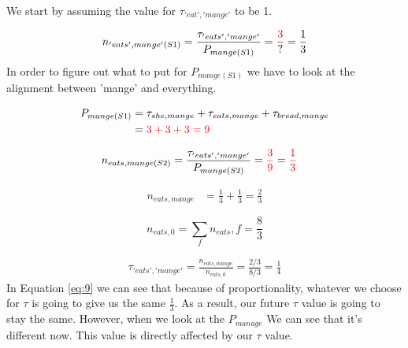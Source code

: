 \documentclass[11pt]{article}
\begin{document}
\begin{center}
\begin{flushleft}
We start by assuming the value for $\tau_{'eat', 'mange'}$  to be 1. 

\begin{equation}
    n_{'eats', mange'(S1)} = \frac{\tau_{'eats', 'mange'}}{P_{mange(S1)}} = \frac{{\color{red}3}}{?} = \frac{1}{3}
\end{equation}
In order to figure out what to put for $P_{mange(S1)}$ we have to look at the alignment between 'mange' and everything. 

\begin{equation}
\begin{split}
P_{mange(S1)} & = \tau_{she, mange} + \tau_{eats, mange} + \tau_{bread, mange} \\
       & = {\color{red} 3 + 3 + 3 = 9}
\end{split}
\end{equation}


\begin{equation}
\label{eq:9}
    \begin{split}
        n_{eats, mange(S2)} & = \frac{\tau_{'eats', 'mange'}}{P_{mange(S2)}} = {\color{red} \frac{3}{9}} =   {\color{red} \frac{1}{3} }
    \end{split}
\end{equation}

\begin{equation}
    \begin{split}
        n_{eats, mange} & = \frac{1}{3} + \frac{1}{3} = \frac{2}{3}
    \end{split}
\end{equation}

\begin{equation}
    n_{eats, 0} = \sum_{f}{n_{eats}, f} = \frac{8}{3}
\end{equation}

\begin{equation}
    \begin{split}
        \tau_{'eats', 'mange'} = \frac{n_{eats, mange}}{n_{eats, 0}} = \frac{2/3}{8/3} = \frac{1}{4}
    \end{split}
\end{equation}
 In Equation \ref{eq:9} we can see that because of proportionality, whatever we choose for $\tau$ is going to give us the same $\frac{1}{3}$. As a result, our future $\tau$ value is going to stay the same. However, when we look at the $P_{manage}$ We can see that it's different now. This value is directly affected by our $\tau$ value. 

\end{flushleft}


\end{center}
\end{document}
